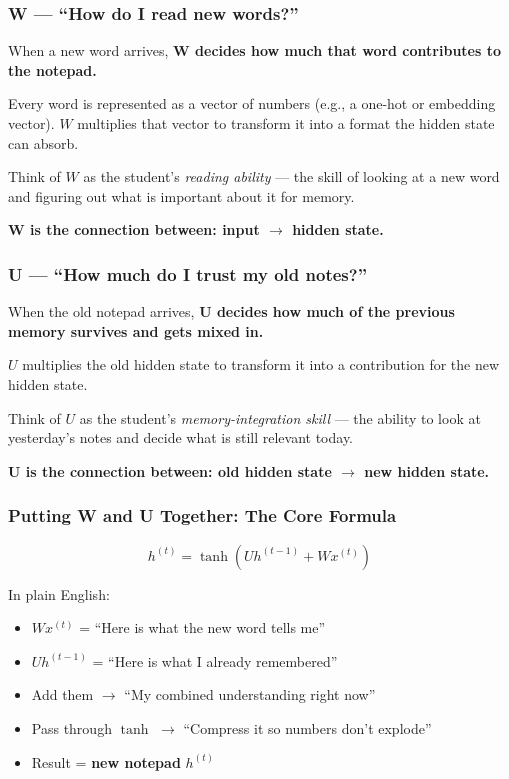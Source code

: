 \subsubsection{W — ``How do I read new words?''}

When a new word arrives, \textbf{W decides how much that word contributes to the notepad.}

Every word is represented as a vector of numbers (e.g., a one-hot or embedding vector). $W$ multiplies that vector to transform it into a format the hidden state can absorb.

Think of $W$ as the student's \textit{reading ability} --- the skill of looking at a new word and figuring out what is important about it for memory.

\textbf{W is the connection between: input $\rightarrow$ hidden state.}

\subsubsection{U — ``How much do I trust my old notes?''}

When the old notepad arrives, \textbf{U decides how much of the previous memory survives and gets mixed in.}

$U$ multiplies the old hidden state to transform it into a contribution for the new hidden state.

Think of $U$ as the student's \textit{memory-integration skill} --- the ability to look at yesterday's notes and decide what is still relevant today.

\textbf{U is the connection between: old hidden state $\rightarrow$ new hidden state.}

\subsubsection{Putting W and U Together: The Core Formula}

\[
h^{(t)} = \tanh\!\left(U h^{(t-1)} + W x^{(t)}\right)
\]

In plain English:
\begin{itemize}
    \item $W x^{(t)}$ = ``Here is what the new word tells me''
    \item $U h^{(t-1)}$ = ``Here is what I already remembered''
    \item Add them $\rightarrow$ ``My combined understanding right now''
    \item Pass through $\tanh$ $\rightarrow$ ``Compress it so numbers don't explode''
    \item Result = \textbf{new notepad} $h^{(t)}$
\end{itemize}

